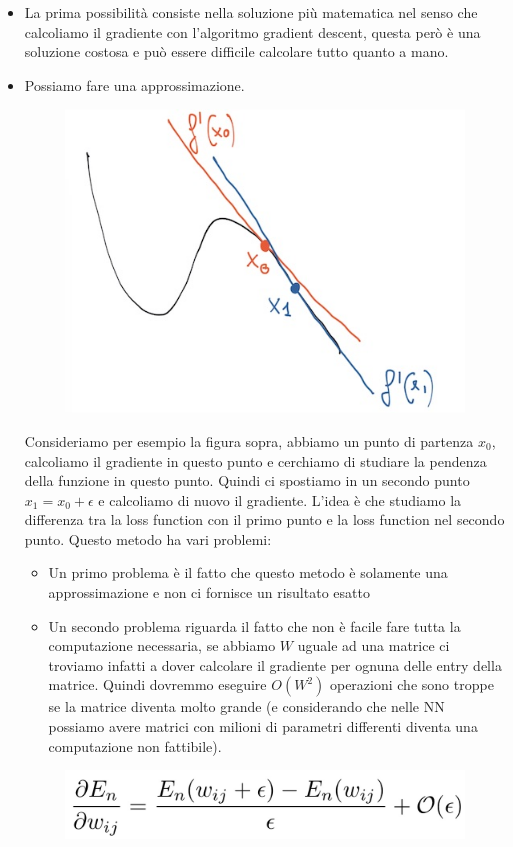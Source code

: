 \documentclass[14pt]{extreport}
\begin{document}
\begin{itemize}
	\item La prima possibilità consiste nella soluzione più matematica nel senso che calcoliamo il gradiente con l'algoritmo gradient descent, questa
	      però è una soluzione costosa e può essere difficile calcolare tutto quanto a mano.
	\item Possiamo fare una approssimazione.

	      \begin{figure}[H]
		      \centering
		      \includegraphics[width=0.4\linewidth]{378.jpeg}
	      \end{figure}
	      Consideriamo per esempio la figura sopra, abbiamo un punto di partenza $x_0$, calcoliamo il gradiente in questo punto e cerchiamo di
	      studiare la pendenza della funzione in questo punto. Quindi ci spostiamo in un secondo punto $x_1 = x_0 + \epsilon$ e calcoliamo di nuovo il
	      gradiente. L'idea è che studiamo la differenza tra la loss function con il primo punto e la loss function nel secondo punto. Questo metodo
	      ha vari problemi:
	      \begin{itemize}
		      \item Un primo problema è il fatto che questo metodo è solamente una approssimazione e non ci fornisce un risultato esatto
		      \item Un secondo problema riguarda il fatto che non è facile fare tutta la computazione necessaria, se abbiamo $W$ uguale ad una matrice
		            ci troviamo infatti a dover calcolare il gradiente per ognuna delle entry della matrice. Quindi dovremmo eseguire $O(W^2)$
		            operazioni che sono troppe se la matrice diventa molto grande (e considerando che nelle NN possiamo avere matrici con milioni di
		            parametri differenti diventa una computazione non fattibile).
	      \end{itemize}
	      \begin{figure}[H]
		      \centering
		      \includegraphics[width=0.5\linewidth]{379.jpeg}

\end{figure}
\end{itemize}
\end{document}
